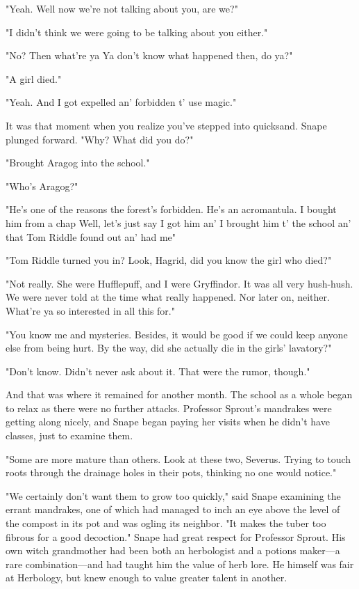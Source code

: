 "Yeah. Well now we're not talking about you, are we?"

"I didn't think we were going to be talking about you either."

"No? Then what're ya{\el} Ya don't know what happened then, do ya?"

"A girl died."

"Yeah. And I got expelled an' forbidden t' use magic."

It was that moment when you realize you've stepped into quicksand. Snape plunged forward. "Why? What did you do?"

"Brought Aragog into the school."

"Who's Aragog?"

"He's one of the reasons the forest's forbidden. He's an acromantula. I bought him from a chap{\el} Well, let's just say I got him an' I brought him t' the school an' that Tom Riddle found out an' had me{\el}"

"Tom Riddle turned you in? Look, Hagrid, did you know the girl who died?"

"Not really. She were Hufflepuff, and I were Gryffindor. It was all very hush-hush. We were never told at the time what really happened. Nor later on, neither. What're ya so interested in all this for."

"You know me and mysteries. Besides, it would be good if we could keep anyone else from being hurt. By the way, did she actually die in the girls' lavatory?"

"Don't know. Didn't never ask about it. That were the rumor, though."

And that was where it remained for another month. The school as a whole began to relax as there were no further attacks. Professor Sprout's mandrakes were getting along nicely, and Snape began paying her visits when he didn't have classes, just to examine them.

"Some are more mature than others. Look at these two, Severus. Trying to touch roots through the drainage holes in their pots, thinking no one would notice."

"We certainly don't want them to grow too quickly," said Snape examining the errant mandrakes, one of which had managed to inch an eye above the level of the compost in its pot and was ogling its neighbor. "It makes the tuber too fibrous for a good decoction." Snape had great respect for Professor Sprout. His own witch grandmother had been both an herbologist and a potions maker—a rare combination—and had taught him the value of herb lore. He himself was fair at Herbology, but knew enough to value greater talent in another.

